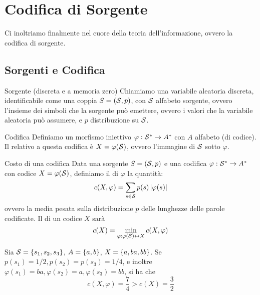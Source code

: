 \chapter{Codifica di Sorgente}

Ci inoltriamo finalmente nel cuore della teoria dell'informazione, ovvero la codifica di sorgente.

\section{Sorgenti e Codifica}

\begin{definition}{Sorgente (discreta e a memoria zero)}
  Chiamiamo  una variabile aleatoria discreta, identificabile come una coppia \(S = (\mathcal{S},p)\), con \(\mathcal{S}\) alfabeto sorgente, ovvero l'insieme dei simboli che la sorgente può emettere,
  ovvero i valori che la variabile aleatoria può assumere, e \(p\) distribuzione su \(\mathcal{S}\).
\end{definition}

\begin{definition}{Codifica}
  Definiamo  un morfismo iniettivo \(\varphi: \mathcal{S}^* \to A^*\) con \(A\) alfabeto (di codice).
  Il  relativo a questa codifica è \(X = \varphi(\mathcal{S})\), ovvero l'immagine di \(\mathcal{S}\) sotto \(\varphi\).
\end{definition}


\begin{definition}{Costo di una codifica}
  Data una sorgente \(S = (\mathcal{S},p)\) e una codifica \(\varphi: \mathcal{S}^* \to A^*\) con codice \(X = \varphi(\mathcal{S})\), definiamo il  di \(\varphi\) la quantità:
  \[c(X,\varphi) = \sum_{s \in \mathcal{S}} p(s) \left|\varphi(s)\right|\]
  ovvero la media pesata sulla distribuzione \(p\) delle lunghezze delle parole codificate.
  Il  di un codice \(X\) sarà
  \[c(X) = \min_{\varphi: \varphi(\mathcal{S}) \leftrightarrow  X} c(X,\varphi)\]
\end{definition}


\begin{example}[label=ex:codifica]{}
  Sia \(\SCal = \set{s_1,s_2,s_3}\), \(A = \set{a,b}\), \(X = \set{a,ba,bb}\).
  Se \(p(s_1) = 1/2, p(s_2) = p(s_3) = 1/4\), e inoltre \(\varphi(s_1) = ba, \varphi(s_2) = a, \varphi(s_3) = bb\), si ha che
    \[c(X,\varphi) = \frac{7}{4} > c(X) = \frac{3}{2}\]
\end{example}

